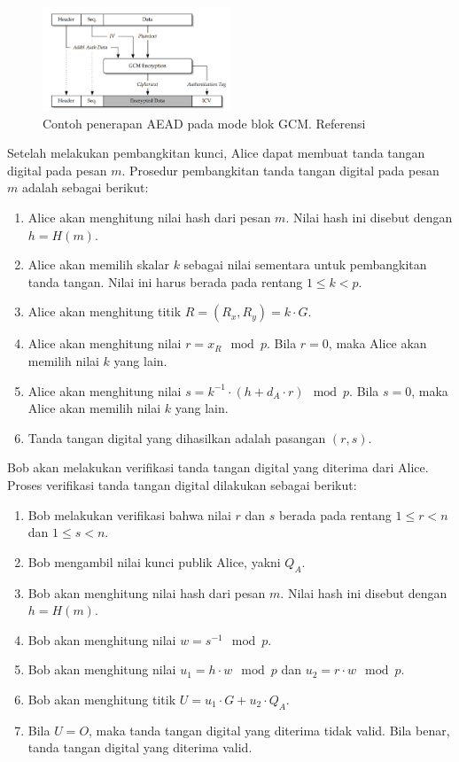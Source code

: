 \documentclass[conference]{IEEEtran}
\begin{document}
\begin{figure}[htbp]
    \centerline{\includegraphics[width=0.5\textwidth]{res/aead.example.png}}
    \caption{Contoh penerapan AEAD pada mode blok GCM. Referensi \cite{mcgrew2005}}
    \label{fig:aead.example}
\end{figure}

Setelah melakukan pembangkitan kunci, Alice dapat membuat tanda tangan digital pada pesan $m$. Prosedur pembangkitan tanda tangan digital pada pesan $m$ adalah sebagai berikut:

\begin{enumerate}
    \item Alice akan menghitung nilai hash dari pesan $m$. Nilai hash ini disebut dengan $h = H(m)$.
    \item Alice akan memilih skalar $k$ sebagai nilai sementara untuk pembangkitan tanda tangan. Nilai ini harus berada pada rentang $1 \le k < p$.
    \item Alice akan menghitung titik $R = (R_x, R_y) = k \cdot G$. 
    \item Alice akan menghitung nilai $r = x_R \mod p$. Bila $r = 0$, maka Alice akan memilih nilai $k$ yang lain.
    \item Alice akan menghitung nilai $s = k^{-1} \cdot (h + d_A \cdot r) \mod p$. Bila $s = 0$, maka Alice akan memilih nilai $k$ yang lain.
    \item Tanda tangan digital yang dihasilkan adalah pasangan $(r, s)$.
\end{enumerate}

Bob akan melakukan verifikasi tanda tangan digital yang diterima dari Alice. Proses verifikasi tanda tangan digital dilakukan sebagai berikut:

\begin{enumerate}
    \item Bob melakukan verifikasi bahwa nilai $r$ dan $s$ berada pada rentang $1 \le r < n$ dan $1 \le s < n$.
    \item Bob mengambil nilai kunci publik Alice, yakni $Q_A$.
    \item Bob akan menghitung nilai hash dari pesan $m$. Nilai hash ini disebut dengan $h = H(m)$.
    \item Bob akan menghitung nilai $w = s^{-1} \mod p$.
    \item Bob akan menghitung nilai $u_1 = h \cdot w \mod p$ dan $u_2 = r \cdot w \mod p$.
    \item Bob akan menghitung titik $U = u_1 \cdot G + u_2 \cdot Q_A$.
    \item Bila $U = O$, maka tanda tangan digital yang diterima tidak valid. Bila benar, tanda tangan digital yang diterima valid.
\end{enumerate}
\end{document}
